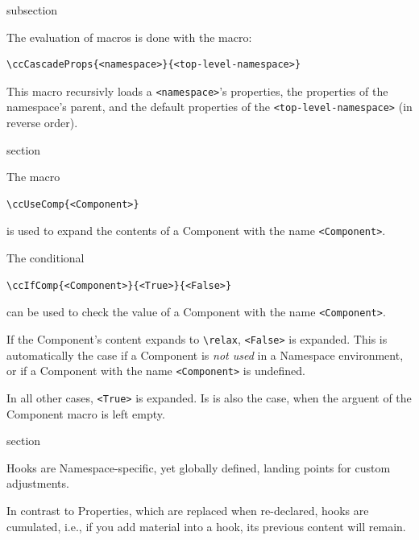 \begin{Heading}{subsection}
\end{Heading}

The evaluation of macros is done with the macro:
\begin{lstlisting}[style=tex]
\ccCascadeProps{<namespace>}{<top-level-namespace>}
\end{lstlisting}
This macro recursivly loads a \lstinline{<namespace>}'s properties, the
properties of the namespace's parent, and the default properties of the
\lstinline{<top-level-namespace>} (in reverse order).

\begin{Heading}[label=sec:common:components]{section}
\end{Heading}

The macro
\begin{lstlisting}[style=tex]
\ccUseComp{<Component>}
\end{lstlisting}
is used to expand the contents of a Component with the name
\lstinline{<Component>}.

The conditional
\begin{lstlisting}[style=tex]
\ccIfComp{<Component>}{<True>}{<False>}
\end{lstlisting}
can be used to check the value of a Component with the name
\lstinline{<Component>}.

If the Component's content expands to \lstinline{\relax},
\lstinline{<False>} is expanded. This is automatically the case if a
Component is \textit{not used} in a Namespace environment, or if a
Component with the name \lstinline{<Component>} is undefined.

In all other cases, \lstinline{<True>} is expanded. Is is also the
case, when the arguent of the Component macro is left empty.

\begin{Heading}[label=sec:common:components]{section}
\end{Heading}

Hooks are Namespace-specific, yet globally defined, landing points for
custom adjustments.

In contrast to Properties, which are replaced when re-declared, hooks
are cumulated, i.e., if you add material into a hook, its previous
content will remain.

